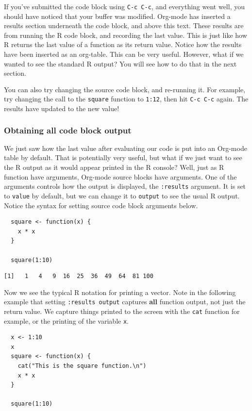 \documentclass[11pt]{article}
\begin{document}
If you've submitted the code block using \texttt{C-c C-c}, and everything
went well, you should have noticed that your buffer was
modified. Org-mode has inserted a results section underneath the code
block, and above this text. These results are from running the R code
block, and recording the last value. This is just like how R returns
the last value of a function as its return value. Notice how the
results have been inserted as an org-table. This can be very
useful. However, what if we wanted to see the standard R output? You
will see how to do that in the next section.

You can also try changing the source code block, and re-running
it. For example, try changing the call to the \texttt{square} function to
\texttt{1:12}, then hit \texttt{C-c C-c} again. The results have updated to the new
value!
\subsubsection*{Obtaining all code block output}
\label{sec-3-2-2}

We just saw how the last value after evaluating our code is put into
an Org-mode table by default. That is potentially very useful, but
what if we just want to see the R output as it would appear printed in
the R console? Well, just as R function have arguments, Org-mode
source blocks have arguments. One of the arguments controls how the
output is displayed, the \texttt{:results} argument. It is set to \texttt{value} by
default, but we can change it to \texttt{output} to see the usual R
output. Notice the syntax for setting source code block arguments
below.

\begin{verbatim}
  square <- function(x) {
    x * x
  }

  square(1:10)
\end{verbatim}

\begin{verbatim}
[1]   1   4   9  16  25  36  49  64  81 100
\end{verbatim}


Now we see the typical R notation for printing a vector. Note in the
following example that setting \texttt{:results output} captures \textbf{all}
function output, not just the return value. We capture things printed
to the screen with the \texttt{cat} function for example, or the printing of
the variable \texttt{x}.

\begin{verbatim}
  x <- 1:10
  x
  square <- function(x) {
    cat("This is the square function.\n")
    x * x
  }
  
  square(1:10)
\end{verbatim}
\end{document}
